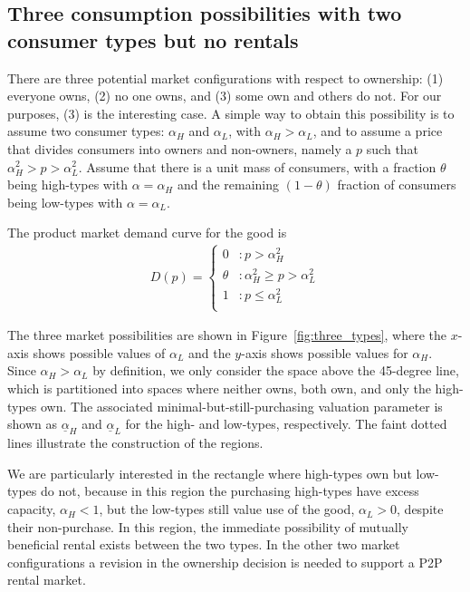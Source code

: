\documentclass[12pt]{article}
\begin{document}
\subsection{Three consumption possibilities with two consumer types but no rentals} 
There are three potential market configurations with respect to ownership:
(1) everyone owns, (2) no one owns, and (3) some own and others do not.
For our purposes, (3) is the interesting case.
A simple way to obtain this possibility is to assume two consumer
types: $\alpha_H$ and $\alpha_L$, with $\alpha_H > \alpha_L$, and to assume a price that divides consumers into owners and non-owners, namely a $p$ such that $\alpha_H^2 > p > \alpha_L^2$.
Assume that there is a unit mass of consumers, with a fraction $\theta$ being high-types with $\alpha = \alpha_H$ and the remaining $(1-\theta)$ fraction of consumers being low-types with $\alpha = \alpha_L$. 

The product market demand curve for the good is 
\begin{align} \label{eq:demand}
   D(p) = \left\{
     \begin{array}{ll}
       0 & : p > \alpha_H^2\\
       \theta & : \alpha_H^2 \ge p > \alpha_L^2  \\
       1 & : p \le \alpha_L^2  \\
     \end{array}
   \right. 
\end{align} 

The three market possibilities are shown in Figure~\ref{fig:three_types}, where the $x$-axis shows possible values of $\alpha_L$ and the $y$-axis shows possible values for $\alpha_H$.
Since $\alpha_H > \alpha_L$ by definition, we only consider the space above the 45-degree line, which is partitioned into spaces where neither owns, both own, and only the high-types own. 
The associated minimal-but-still-purchasing valuation parameter is shown as $\underline{\alpha}_H$ and $\underline{\alpha}_L$ for the high- and low-types, respectively. 
The faint dotted lines illustrate the construction of the regions.

We are particularly interested in the rectangle where high-types own but low-types do not, because in this region the purchasing high-types have excess capacity, $\alpha_H < 1$, but the low-types still value use of the good, $\alpha_L > 0$, despite their non-purchase. 
In this region, the immediate possibility of mutually beneficial rental exists between the two types. 
In the other two market configurations a revision in the ownership decision is needed to support a P2P rental market. 
\end{document}

